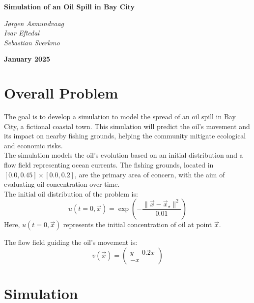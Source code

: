 \documentclass{article}
\begin{document}
\begin{titlepage}
\centering
\vspace*{1cm} 
{\Large \textbf{Simulation of an Oil Spill in Bay City} \par} 
\vspace{1.5cm} 
{\large
\textit{Jørgen Asmundvaag \\ 
Ivar Eftedal \\ 
Sebastian Sverkmo} \par}
\vspace{1.5cm} 
{\large \textbf{January 2025} \par}
\vspace*{\fill} 
\end{titlepage}

\newpage
\tableofcontents
\newpage

\section{Overall Problem}
The goal is to develop a simulation to model the spread of an oil spill in Bay City, a fictional coastal town. This simulation will predict the oil's movement and its impact on nearby fishing grounds, helping the community mitigate ecological and economic risks.\\
The simulation models the oil's evolution based on an initial distribution and a flow field representing ocean currents. The fishing grounds, located in $[0.0, 0.45] \times [0.0, 0.2]$, are the primary area of concern, with the aim of evaluating oil concentration over time.\\
The initial oil distribution of the problem is:
\begin{equation}
u(t=0, \vec{x}) = \exp\left(-\frac{\|\vec{x} - \vec{x}_\star\|^2}{0.01}\right)
\end{equation}
Here, $u(t=0, \vec{x})$ represents the initial concentration of oil at point $\vec{x}$.

The flow field guiding the oil's movement is:
\begin{equation}
v(\vec{x}) = 
\begin{pmatrix}
y - 0.2x \\
-x
\end{pmatrix}
\end{equation}

\section{Simulation}
\end{document}
